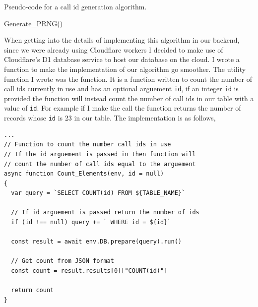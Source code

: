 \begin{algorithm}[H]
\caption{Pseudo-code for a call id generation algorithm.}
\sffamily

\begin{algorithmic}[1]

    \State{}

      Generate\_PRNG()
    \EndIf

    \State{}


  \EndFunction
\end{algorithmic}
\end{algorithm}

\mdseries

When getting into the details of implementing this algorithm
in our backend, since we were already using Cloudflare workers
I decided to make use of Cloudflare's D1 database service to
host our database on the cloud. I wrote a function
to make the implementation of our algorithm go smoother. The
utility function I wrote was the  function.
It is a function written to count the number of call ids
currently in use and has an optional arguement \texttt{id}, if
an integer \texttt{id} is provided the function will instead
count the number of call ids in our table with a value of
\texttt{id}. For example if I make the call
 the function returns the number of
records whose \texttt{id} is 23 in our table. The implementation
is as follows,

\begin{verbatim}
...
// Function to count the number call ids in use
// If the id arguement is passed in then function will
// count the number of call ids equal to the arguement
async function Count_Elements(env, id = null)
{
  var query = `SELECT COUNT(id) FROM ${TABLE_NAME}`

  // If id arguement is passed return the number of ids
  if (id !== null) query += ` WHERE id = ${id}`

  const result = await env.DB.prepare(query).run()

  // Get count from JSON format
  const count = result.results[0]["COUNT(id)"]

  return count
}
\end{verbatim}

